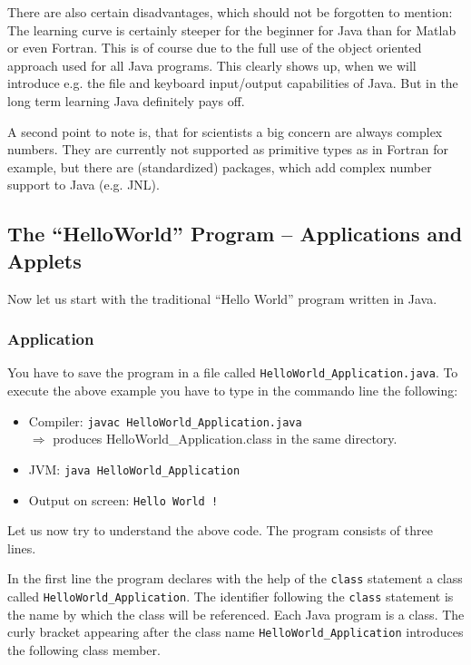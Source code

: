 There are also certain disadvantages, which should not be forgotten
to mention: The learning curve is certainly steeper for the beginner
for Java than for Matlab or even Fortran. This is of course due
to the full use of the object oriented approach used for all Java
programs. This clearly shows up, when we will introduce e.g. the
file and keyboard input/output capabilities of Java.
But in the long term learning Java definitely pays off. 

A second point to note is, that for scientists a big concern are always
complex numbers. They are currently not supported as primitive types as 
in Fortran for example, but there are (standardized) packages, which
add complex number support to Java (e.g. JNL). 


\subsection{The ``HelloWorld'' Program -- Applications and Applets}
\label{sec:HelloWorld}
Now let us start with the traditional ``Hello World'' program written
in Java.

\subsubsection{Application}

You have to save the program in a file called 
\verb|HelloWorld_Application.java|.
To execute the above example you have to type in the commando line the
following:
\begin{itemize}
\item Compiler: \verb/javac HelloWorld_Application.java/  \\
  $\Longrightarrow$ produces HelloWorld\_Application.class 
  in the same directory.
\item JVM:  \verb/java HelloWorld_Application/
\item Output on screen: \verb|Hello World !|
\end{itemize}
Let us now try to understand the above code. The program consists of
three lines. 

In the first line the program declares 
with the help of the \texttt{class} statement a class called 
\verb|HelloWorld_Application|. 
The identifier following the \texttt{class} statement is
the name by which the class will be referenced. Each Java program
is a class. The curly bracket appearing after the class name
\verb|HelloWorld_Application| introduces the following class member. 



